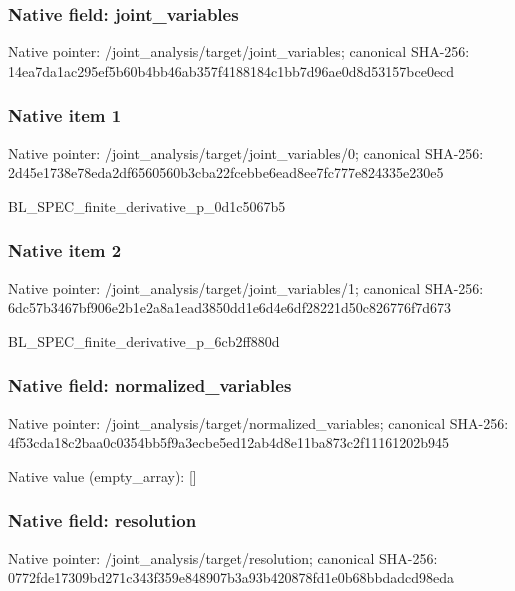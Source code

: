 \documentclass[10pt,a4paper]{article}
\begin{document}
\subsubsection{Native field: joint\_\allowbreak{}variables}
Native pointer: /joint\_\allowbreak{}analysis/target/joint\_\allowbreak{}variables; canonical SHA-256: 14ea7da1ac295ef5b60b4bb46ab357f4188184c1bb7d96ae0d8d53157bce0ecd

\subsubsection{Native item 1}
Native pointer: /joint\_\allowbreak{}analysis/target/joint\_\allowbreak{}variables/0; canonical SHA-256: 2d45e1738e78eda2df6560560b3cba22fcebbe6ead8ee7fc777e824335e230e5

\begingroup\raggedright\sloppy BL\_\allowbreak{}SPEC\_\allowbreak{}finite\_\allowbreak{}derivative\_\allowbreak{}p\_\allowbreak{}0d1c5067b5\par\endgroup

\subsubsection{Native item 2}
Native pointer: /joint\_\allowbreak{}analysis/target/joint\_\allowbreak{}variables/1; canonical SHA-256: 6dc57b3467bf906e2b1e2a8a1ead3850dd1e6d4e6df28221d50c826776f7d673

\begingroup\raggedright\sloppy BL\_\allowbreak{}SPEC\_\allowbreak{}finite\_\allowbreak{}derivative\_\allowbreak{}p\_\allowbreak{}6cb2ff880d\par\endgroup

\subsubsection{Native field: normalized\_\allowbreak{}variables}
Native pointer: /joint\_\allowbreak{}analysis/target/normalized\_\allowbreak{}variables; canonical SHA-256: 4f53cda18c2baa0c0354bb5f9a3ecbe5ed12ab4d8e11ba873c2f11161202b945

Native value (empty\_\allowbreak{}array): []

\subsubsection{Native field: resolution}
Native pointer: /joint\_\allowbreak{}analysis/target/resolution; canonical SHA-256: 0772fde17309bd271c343f359e848907b3a93b420878fd1e0b68bbdadcd98eda
\end{document}
